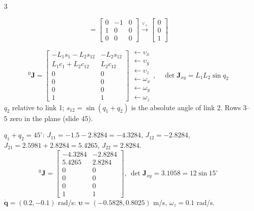 \begin{multicols}{3}
\begin{deriv}
\[=\begin{bmatrix}0&-1&0\\1&0&0\\0&0&0\end{bmatrix}\xrightarrow{\vee_\times}\begin{bmatrix}0\\0\\1\end{bmatrix}\]
\end{deriv}
\begin{fbx}
\[{}^0\mathbf J=\begin{bmatrix}-L_1s_1-L_2s_{12}&-L_2s_{12}\\L_1c_1+L_2c_{12}&L_2c_{12}\\0&0\\0&0\\0&0\\1&1\end{bmatrix}\begin{matrix}\leftarrow\upsilon_x\\\leftarrow\upsilon_y\\\leftarrow\upsilon_z\\\leftarrow\omega_x\\\leftarrow\omega_y\\\leftarrow\omega_z\end{matrix},\quad\det\mathbf J_{xy}=L_1L_2\sin q_2\]
$q_2$ relative to link 1; $s_{12}=\sin(q_1{+}q_2)$ is the absolute angle of link 2. Rows 3--5 zero in the plane (slide 45).
\end{fbx}
\begin{worked}[notebook Q1: $L=(3,4)$ m, $q_1=30^\circ$, $q_2=15^\circ$]
$q_1{+}q_2=45^\circ$: $J_{11}=-1.5-2.8284=-4.3284$, $J_{12}=-2.8284$, $J_{21}=2.5981+2.8284=5.4265$, $J_{22}=2.8284$.
\[{}^0\mathbf J=\begin{bmatrix}-4.3284&-2.8284\\5.4265&2.8284\\0&0\\0&0\\0&0\\1&1\end{bmatrix},\ \det\mathbf J_{xy}=3.1058=12\sin15^\circ\]
$\dot{\mathbf q}=(0.2,-0.1)$ rad/s: $\boldsymbol\upsilon=(-0.5828,0.8025)$ m/s, $\omega_z=0.1$ rad/s. \chk
\end{worked}


\end{multicols}
